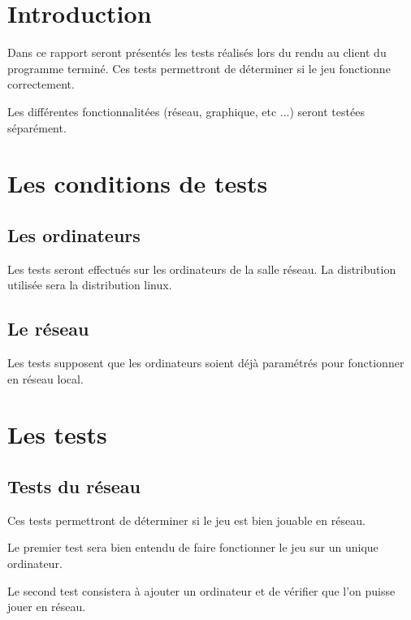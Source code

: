 \section*{Introduction}

Dans ce rapport seront présentés les tests réalisés lors du rendu au client du programme terminé. Ces tests permettront de déterminer si le jeu fonctionne correctement.

\vspace{0.5cm}

Les différentes fonctionnalitées (réseau, graphique, etc ...) seront testées séparément.


\section{Les conditions de tests}


\subsection{Les ordinateurs}

Les tests seront effectués sur les ordinateurs de la salle réseau. La distribution utilisée sera la distribution linux.

\subsection{Le réseau}

Les tests supposent que les ordinateurs soient déjà paramétrés pour fonctionner en réseau local.


\section{Les tests}

\subsection{Tests du réseau}

Ces tests permettront de déterminer si le jeu est bien jouable en réseau.

Le premier test sera bien entendu de faire fonctionner le jeu sur un unique ordinateur.

Le second test consistera à ajouter un ordinateur et de vérifier que l'on puisse jouer en réseau.

